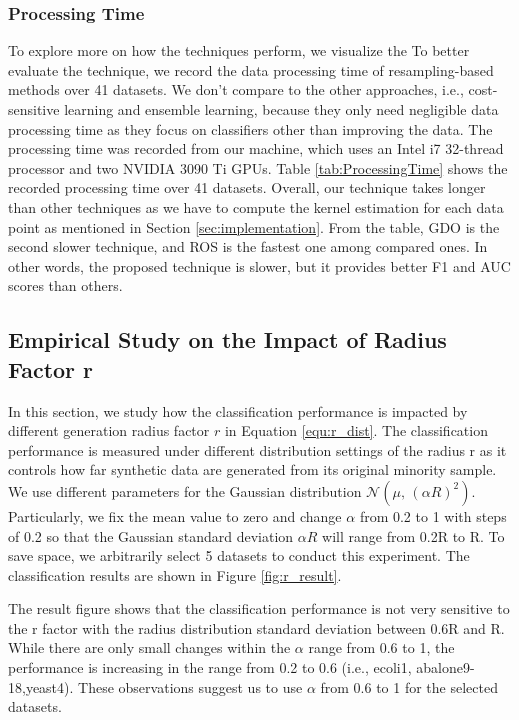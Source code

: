 \subsubsection{Processing Time}
\label{sec:processingTime}
To explore more on how the techniques perform, we visualize the To better evaluate the technique, we record the data processing time of resampling-based methods over 41 datasets. We don't compare to the other approaches, i.e., cost-sensitive learning and ensemble learning, because they only need negligible data processing time as they focus on classifiers other than improving the data. The processing time was recorded from our machine, which uses an Intel i7 32-thread processor and two NVIDIA 3090 Ti GPUs. 
Table \ref{tab:ProcessingTime} shows the recorded processing time over 41 datasets. Overall, our technique takes longer than other techniques as we have to compute the kernel estimation for each data point as mentioned in Section \ref{sec:implementation}. From the table, GDO is the second slower technique, and ROS is the fastest one among compared ones. In other words, the proposed technique is slower, but it provides better F1 and AUC scores than others.
	



\subsection{Empirical Study on the Impact of Radius Factor r}
\label{sec:simpor_r_distribution_impact}
In this section, we study how the classification performance is impacted by different generation radius factor $r$ in Equation \ref{equ:r_dist}. The classification performance is measured under different distribution settings of the radius r as it controls how far synthetic data are generated from its original minority sample. We use different parameters for the Gaussian distribution $\mathcal{N}(\mu ,\,{(\alpha R)}^{2})$. Particularly, we fix the mean value to zero and change $\alpha$ from 0.2 to 1 with steps of 0.2 so that the Gaussian standard deviation $\alpha R$ will range from 0.2R to R. To save space, we arbitrarily select 5 datasets to conduct this experiment. The classification results are shown in Figure \ref{fig:r_result}. 

The result figure shows that the classification performance is not very sensitive to the r factor with the radius distribution standard deviation between 0.6R and R. While there are only small changes within the $\alpha$ range from 0.6 to 1, the performance is increasing in the range from 0.2 to 0.6 (i.e., ecoli1, abalone9-18,yeast4). These observations suggest us to use $\alpha$ from 0.6 to 1 for the selected datasets.      

